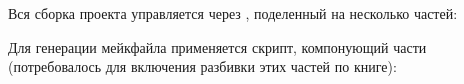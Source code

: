 
Вся сборка проекта управляется через , поделенный на несколько
частей:



Для генерации мейкфайла применяется скрипт, компонующий части (потребовалось
для включения разбивки этих частей по книге):



\secdown




\secup